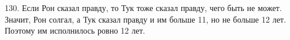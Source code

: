 130. Если Рон сказал правду, то Тук тоже сказал правду, чего быть не может. Значит, Рон солгал, а Тук сказал правду и им больше 11, но не больше 12 лет. Поэтому им исполнилось ровно 12 лет.\\
